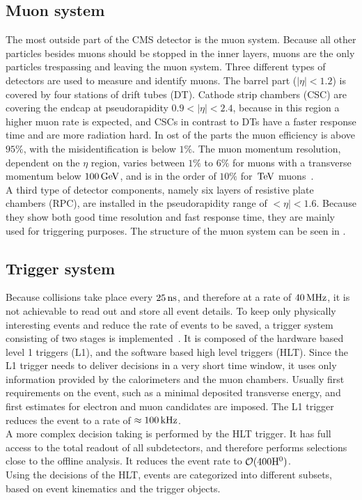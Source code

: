 \subsection{Muon system}
The most outside part of the CMS detector is the muon system. Because all other particles besides muons should be stopped in the inner layers, muons are the only particles trespassing and leaving the muon system. Three different types of detectors are used to measure and identify muons. The barrel part ($|\eta|<1.2$) is covered by four stations of drift tubes (DT). Cathode strip chambers (CSC) are covering the endcap at pseudorapidity $0.9<|\eta|<2.4$, because in this region a higher muon rate is expected, and CSCs in contrast to DTs have a faster response time and are more radiation hard. In ost of the parts the muon efficiency is above $95\%$, with the misidentification is below $1\%$. The muon momentum resolution, dependent on the $\eta$ region, varies between $1\%$ to $6\%$ for muons with a transverse momentum below $100\,\text{Ge\hspace{-.08em}V}$, and is in the order of $10\%$ for $\,\text{Te\hspace{-.08em}V}$ muons~\cite{MuonPerformance}.\\
A third type of detector components, namely six layers of resistive plate chambers (RPC), are installed in the pseudorapidity range of $<\eta|<1.6$. Because they show both good time resolution and fast response time, they are mainly used for triggering purposes. The structure of the muon system can be seen in .

\subsection{Trigger system}
Because collisions take place every $25\,\text{ns}$, and therefore at a rate of $40\,\text{MHz}$, it is not achievable to read out and store all event details. To keep only physically interesting events and reduce the rate of events to be saved, a trigger system consisting of two stages is implemented~\cite{TriggerSystem}. It is composed of the hardware based level 1 triggers (L1), and the software based high level triggers (HLT). Since the L1 trigger needs to deliver decisions in a very short time window, it uses only information provided by the calorimeters and the muon chambers. Usually first requirements on the event, such as a minimal deposited transverse energy, and first estimates for electron and muon candidates are imposed. The L1 trigger reduces the event to a rate of $\approx100\,\text{kHz}$.\\
A more complex decision taking is performed by the HLT trigger. It has full access to the total readout of all subdetectors, and therefore performs selections close to the offline analysis. It reduces the event rate to $\mathcal{O}(400\mathrm{H}^{0})$.\\
Using the decisions of the HLT, events are categorized into different subsets, based on event kinematics and the trigger objects.
